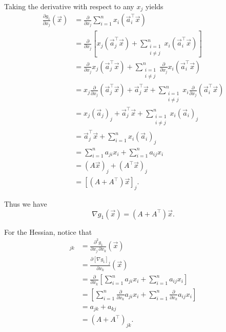 \documentclass[10pt]{article}
\theoremstyle{definition}
\theoremstyle{plain}
\begin{document}
\begin{enumerate}[label=(\alph*)]
\begin{enumerate}[label=\roman*.]
    Taking the derivative with respect to any $x_j$ yields
    \begin{align}
    \frac{\partial g_1}{\partial x_j}(\vec{x}) &= \frac{\partial}{\partial x_j} \sum_{i=1}^n x_i (\vec{a}_i^\top \vec{x}) \\
    &= \frac{\partial}{\partial x_j}\left[x_j(\vec{a}_j^\top \vec{x}) + \sum_{\substack{i=1\\i\neq j}}^n x_i(\vec{a}_i^\top \vec{x})\right] \\
    &= \frac{\partial}{\partial x_j} x_j(\vec{a}_j^\top \vec{x}) + \sum_{\substack{i=1\\i\neq j}}^n \frac{\partial}{\partial x_j} x_i(\vec{a}_i^\top \vec{x}) \\
    &= x_j \frac{\partial}{\partial x_j}(\vec{a}_j^\top \vec{x}) + \vec{a}_j^\top \vec{x} + \sum_{\substack{i=1\\i\neq j}}^n x_i \frac{\partial}{\partial x_j}(\vec{a}_i^\top \vec{x}) \\
    &= x_j (\vec{a}_j)_j + \vec{a}_j^\top \vec{x} + \sum_{\substack{i=1\\i\neq j}}^n x_i (\vec{a}_i)_j \\
    &= \vec{a}_j^\top \vec{x} + \sum_{i=1}^n x_i (\vec{a}_i)_j \\
    &= \sum_{i=1}^n a_{ji} x_i + \sum_{i=1}^n a_{ij} x_i \\
    &= (A\vec{x})_j + (A^\top \vec{x})_j \\
    &= [(A + A^\top)\vec{x}]_j.
    \end{align}

    Thus we have
    \begin{equation}
    \nabla g_1(\vec{x}) = (A + A^\top)\vec{x}.
    \end{equation}

    For the Hessian, notice that
    \begin{align}
    [\nabla^2 g_1(\vec{x})]_{jk} &= \frac{\partial^2 g_1}{\partial x_j\, \partial x_k}(\vec{x}) \\
    &= \frac{\partial [\nabla g_1]_j}{\partial x_k}(\vec{x}) \\
    &= \frac{\partial}{\partial x_k}\left[\sum_{i=1}^n a_{ji} x_i + \sum_{i=1}^n a_{ij} x_i\right] \\
    &= \left[\sum_{i=1}^n \frac{\partial}{\partial x_k} a_{ji} x_i + \sum_{i=1}^n \frac{\partial}{\partial x_k} a_{ij} x_i\right] \\
    &= a_{jk} + a_{kj} \\
    &= (A + A^\top)_{jk}.
    \end{align}


\end{enumerate}
\end{enumerate}
\end{document}
